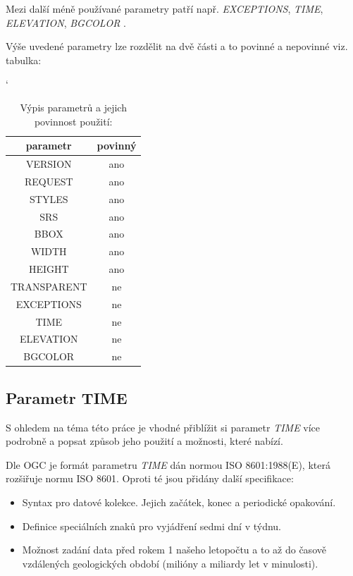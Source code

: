 Mezi další méně používané parametry patří např. \textit{EXCEPTIONS},
\textit{TIME}, \textit{ELEVATION}, \textit{BGCOLOR} \cite{oqc_wms}.

Výše uvedené parametry lze rozdělit na dvě části a to povinné a
nepovinné viz. tabulka:

\bigskip
\begin{table}[h!]
	\catcode`
	\centering
	\begin{tabular}{|c|c|}
		\hline
		parametr & povinný \\ \hline
		\hline
		VERSION & ano \\ \hline
		REQUEST & ano \\ \hline
		STYLES & ano \\ \hline
		SRS & ano \\ \hline
		BBOX & ano \\ \hline
		WIDTH & ano \\ \hline
		HEIGHT & ano \\ \hline
		TRANSPARENT & ne \\ \hline
		EXCEPTIONS & ne \\ \hline
		TIME & ne \\ \hline
		ELEVATION & ne \\ \hline
		BGCOLOR & ne \\ \hline
\end{tabular}
	\caption{Výpis parametrů a jejich povinnost použití: \cite{oqc_wms}}
	\label{tab:WPS_ExecuteRequest}
\end{table}

\subsection{Parametr TIME}

S ohledem na téma této práce je vhodné přiblížit si parametr
\textit{TIME} více podrobně a popsat způsob jeho použití a možnosti,
které nabízí.

Dle OGC je formát parametru \textit{TIME} dán normou ISO 8601:1988(E),
která rozšiřuje normu ISO 8601. Oproti té jsou přidány další
specifikace\cite{oqc_wms}:
\begin{itemize}
\item Syntax pro datové kolekce. Jejich začátek, konec a periodické
  opakování.
\item Definice speciálních znaků pro vyjádření sedmi dní v týdnu.
\item Možnost zadání data před rokem 1 našeho letopočtu a to až do
  časově vzdálených geologických období (milióny a miliardy let v
  minulosti).
\end{itemize}


